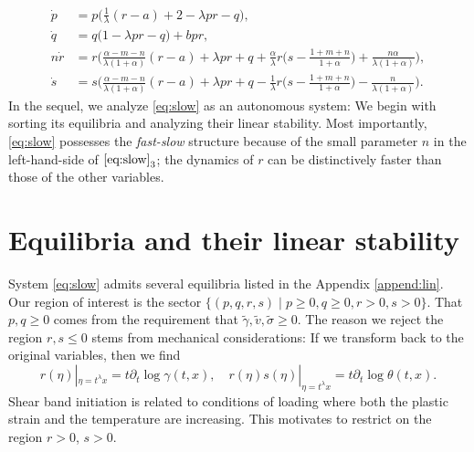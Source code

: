 \documentclass[a4paper,11pt]{article}
\def\tg{{\tilde{\gamma}}}
\def\tv{{\tilde{v}}}
\def\ts{{\tilde{\sigma}}}
\theoremstyle{remark}
\begin{document}
\begin{equation}\label{eq:slow} \tag{S}
 \begin{aligned}
 \dot{p} &=p\Big(\frac{1}{\lambda}(r-a) + 2- \lambda p r -q\Big),\\
 \dot{q} &=q\Big(1 -\lambda p r -q\Big) + b p r,\\
 n\dot{r} &=r\Big(\frac{\alpha-m-n}{\lambda(1+\alpha)}(r-a) + \lambda pr + q +\frac{\alpha}{\lambda}r\big(s- \frac{1+m+n}{1+\alpha}\big) + \frac{n\alpha}{\lambda(1+\alpha)}\Big),\\
 \dot{s} &=s\Big(\frac{\alpha-m-n}{\lambda(1+\alpha)}(r-a) + \lambda pr + q - \frac{1}{\lambda}r\big(s- \frac{1+m+n}{1+\alpha}\big) - \frac{n}{\lambda(1+\alpha)}\Big).
 \end{aligned}
\end{equation}
In the sequel, we analyze \eqref{eq:slow} as an autonomous system: We begin with sorting its equilibria and analyzing their linear stability. Most importantly, \eqref{eq:slow} possesses the {\it fast-slow} structure because of the small parameter $n$ in the left-hand-side of $\eqref{eq:slow}_3$; the dynamics of $r$ can be distinctively faster than those of the other variables.



\vfil\eject

\section{Equilibria and their linear stability} \label{sec:equil}

System \eqref{eq:slow} admits several equilibria listed in the Appendix \ref{append:lin}. Our region of interest is the sector $\{(p,q,r,s) \; | \; p\ge0, q\ge0, r>0, s>0 \}$. That $p,q\ge0$ comes from the requirement that $\tg,\tv,\ts\ge0$. The reason we reject the region $r,s\le0$ stems from mechanical considerations: If we transform back to the original variables, then we find
\begin{equation*}
 r(\eta)|_{\eta=t^\lambda x}=t\partial_t\log \gamma(t,x), \quad r(\eta)s(\eta)|_{\eta=t^\lambda x}=t\partial_t \log \theta(t,x).
\end{equation*}
Shear band initiation is related to conditions of loading where both the plastic strain and the temperature are increasing. This motivates to restrict on the region $r > 0$, $s > 0$.
\end{document}
